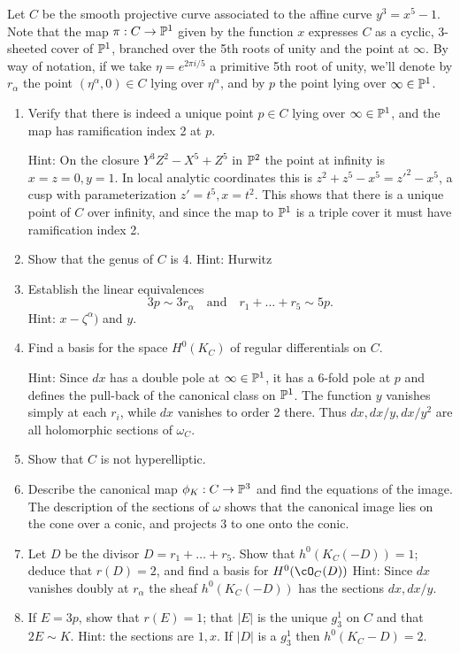 \begin{exercise}
Let $C$ be the smooth projective curve associated to the affine curve 
$y^3 = x^5 -1$. 
Note that the map $\pi : C \to \PP^1$ given by the function $x$ expresses $C$ as a cyclic, 3-sheeted cover of $\PP^1$, branched over the 5th roots of unity and the point at $\infty$. By way of notation, if we take $\eta = e^{2\pi i/5}$ a primitive 5th root of unity, we'll denote by $r_\alpha$ the point $(\eta^\alpha, 0) \in C$ lying over $\eta^\alpha$, and by $p$ the point lying over $\infty \in \PP^1$.

\begin{enumerate}
\item Verify that there is indeed a unique point $p \in C$ lying over $\infty \in \PP^1$, and the map has ramification index 2 at $p$. 

Hint: On the closure  $Y^3Z^2-X^5+Z^5$ in $\PP^2$ the point at infinity is $x=z=0, y=1$. In local analytic coordinates this is
$z^2+z^5-x^5 = z'^2-x^5$, a cusp with parameterization $z'=t^5, x= t^2$. This shows that there is a unique point of $C$
over infinity, and since the map to $\PP^1$ is a triple cover it must have ramification index 2. 

\item Show that the genus of $C$ is 4. Hint: Hurwitz

\item Establish the linear equivalences
$$
3p \sim 3r_\alpha \quad \text{and} \quad r_1+ \dots + r_5 \sim 5p. 
$$
Hint: $x-\zeta^\alpha)$ and $y$.
\item Find a basis for the space $H^0(K_C)$ of regular differentials on $C$.

Hint: Since
$dx$ has a double pole at $\infty \in \PP^1$, it has a 6-fold pole at $p$ and defines the pull-back of the canonical
class on $\PP^1$. The function $y$ vanishes simply
at each $r_i$, while $dx$ vanishes to order 2 there. Thus $dx, dx/y, dx/y^2$ are all holomorphic sections of $\omega_C$.

\item Show that $C$ is not hyperelliptic.
\item Describe the canonical map $\phi_K : C \to \PP^3$ and find the equations of the image.
The description of the sections of $\omega$  shows that the canonical image lies on the cone over a conic,
and projects 3 to one onto the conic.
\item Let $D$ be the divisor $D = r_1+\dots+r_5$. Show that $h^0(K_C(-D)) = 1$; deduce that $r(D) = 2$, and find a basis for $H^0(\cO_C(D))$
Hint:  Since $dx$ vanishes doubly at $r_\alpha$ the sheaf $h^0(K_C(-D))$ has the sections $dx, dx/y$.

\item If $E = 3p$, show that $r(E) = 1$; that $|E|$ is the unique $g^1_3$ on $C$ and that $2E \sim K$.
Hint: the sections are $1,x$. If $|D|$ is a  $g^1_3$ then $h^0(K_C-D) = 2$.
\end{enumerate}
\end{exercise}


